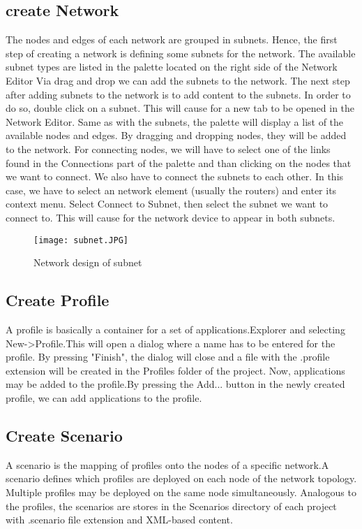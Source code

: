 \subsection{create Network}
The nodes and edges of each network are grouped in subnets. Hence, the first step of creating a network is defining some subnets for the network. The available subnet types are listed in the palette located on the right side of the Network Editor Via drag and drop we can add the subnets to the network.
The next step after adding subnets to the network is to add content to the subnets. In
order to do so, double click on a subnet. This will cause for a new tab to be opened
in the Network Editor. Same as with the subnets, the palette will display a list of the
available nodes and edges. By dragging and dropping nodes, they will be added to the
network. For connecting nodes, we will have to select one of the links found in the
Connections part of the palette and than clicking on the nodes that we want to connect.
We also have to connect the subnets to each other. In this case, we  have to select an network element (usually the routers) and enter its context menu. Select Connect to Subnet, then select the subnet we  want to connect to. This will cause for the network device to appear in both subnets.
\begin{figure}
	\centering
	\texttt{[image: subnet.JPG]}
	\caption{Network design of subnet}
	\label{fig:subnet}
\end{figure}

\newpage
\subsection{Create Profile}
A profile is basically a container for a set of applications.Explorer and selecting New->Profile.This will open a dialog where a name has to be entered for the profile. By pressing "Finish", the dialog will close and a file with the .profile extension will be created in the Profiles folder of the project. Now, applications may be added to the profile.By pressing the Add... button in the newly created profile, we can add applications to the profile.
\subsection{Create Scenario}
A scenario is the mapping of profiles onto the nodes of a specific network.A scenario defines which profiles are deployed on each node of the network topology.
Multiple profiles may be deployed on the same node simultaneously. Analogous to the
profiles, the scenarios are stores in the Scenarios directory of each project with .scenario file extension and XML-based content.
